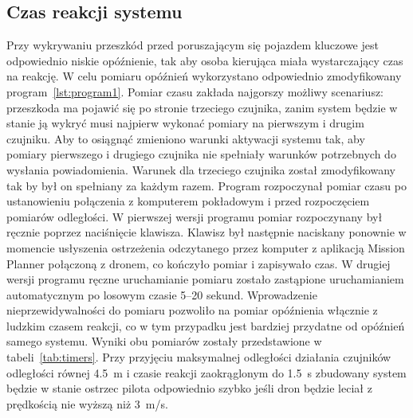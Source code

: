 \documentclass[a4paper,12pt]{book}
\begin{document}
        \subsection{Czas reakcji systemu}
        Przy wykrywaniu przeszkód przed poruszającym się pojazdem kluczowe jest odpowiednio niskie opóźnienie, tak aby osoba kierująca miała wystarczający  
        czas na reakcję. W celu pomiaru opóźnień wykorzystano odpowiednio zmodyfikowany program~\ref{lst:program1}. Pomiar czasu zakłada najgorszy możliwy scenariusz: 
        przeszkoda ma pojawić się po stronie trzeciego czujnika, zanim system będzie w stanie ją wykryć musi najpierw wykonać pomiary na pierwszym i drugim czujniku. 
        Aby to osiągnąć zmieniono warunki 
        aktywacji systemu tak, aby pomiary pierwszego i drugiego czujnika nie spełniały warunków potrzebnych do wysłania powiadomienia. Warunek dla trzeciego czujnika 
        został zmodyfikowany tak by był on spełniany za każdym razem. Program rozpoczynał 
        pomiar czasu po ustanowieniu połączenia z komputerem pokładowym i przed rozpoczęciem pomiarów odległości. W pierwszej wersji programu pomiar rozpoczynany 
        był ręcznie poprzez naciśnięcie klawisza. Klawisz był następnie naciskany ponownie w momencie usłyszenia ostrzeżenia odczytanego przez komputer z aplikacją 
        Mission Planner połączoną z dronem, co kończyło pomiar i zapisywało czas. W drugiej wersji programu ręczne uruchamianie pomiaru zostało zastąpione uruchamianiem 
        automatycznym po losowym czasie 5--20 sekund. Wprowadzenie nieprzewidywalności do pomiaru pozwoliło na pomiar opóźnienia włącznie z ludzkim czasem reakcji, 
        co w tym przypadku jest bardziej przydatne od opóźnień samego systemu. Wyniki obu pomiarów zostały przedstawione w tabeli~\ref{tab:timers}. Przy przyjęciu 
        maksymalnej odległości działania czujników odległości równej 4.5~m i czasie reakcji zaokrąglonym do 1.5~s zbudowany system będzie w stanie ostrzec pilota odpowiednio 
        szybko jeśli dron będzie leciał z prędkością nie wyższą niż 3~m/s.
\end{document}
